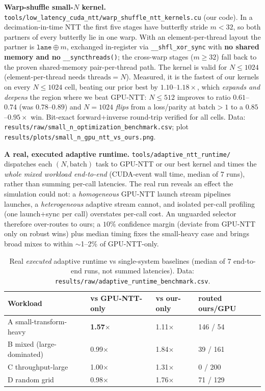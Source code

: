\documentclass[11pt,a4paper]{article}
\begin{document}
\textbf{Warp-shuffle small-$N$ kernel.}
\texttt{tools/low\_latency\_cuda\_ntt/warp\_shuffle\_ntt\_kernels.cu} (our code). In a
decimation-in-time NTT the first five stages have butterfly stride $m<32$, so both partners of
every butterfly lie in one warp. With an element-per-thread layout the partner is $\texttt{lane}
\oplus m$, exchanged in-register via \verb|__shfl_xor_sync| with \textbf{no shared memory and no}
\verb|__syncthreads()|; the cross-warp stages ($m\ge32$) fall back to the proven shared-memory
pair-per-thread path. The kernel is valid for $N\le1024$ (element-per-thread needs
$\text{threads}=N$). Measured, it is the fastest of our kernels on every $N\le1024$ cell, beating
our prior best by $1.10$--$1.18\times$, which \emph{expands and deepens} the region where we beat
GPU-NTT: $N\le512$ improves to ratio $0.61$--$0.74$ (was $0.78$--$0.89$) and $N=1024$ \emph{flips}
from a loss/parity at batch${>}1$ to a $0.85$--$0.95\times$ win. Bit-exact forward+inverse
round-trip verified for all cells. Data: \texttt{results/raw/small\_n\_optimization\_benchmark.csv};
plot \texttt{results/plots/small\_n\_gpu\_ntt\_vs\_ours.png}.

\textbf{A real, executed adaptive runtime.} \texttt{tools/adaptive\_ntt\_runtime/} dispatches each
$(N,\text{batch})$ task to GPU-NTT or our best kernel and times the \emph{whole mixed workload
end-to-end} (CUDA-event wall time, median of 7 runs), rather than summing per-call latencies. The
real run reveals an effect the simulation could not: a \emph{homogeneous} GPU-NTT launch stream
pipelines launches, a \emph{heterogeneous} adaptive stream cannot, and isolated per-call profiling
(one launch+sync per call) overstates per-call cost. An unguarded selector therefore over-routes to
ours; a $10\%$ confidence margin (deviate from GPU-NTT only on robust wins) plus median timing
fixes the small-heavy case and brings broad mixes to within $\sim$1--2\% of GPU-NTT-only.

\begin{table}[h]
\centering
\caption{Real \emph{executed} adaptive runtime vs single-system baselines (median of 7 end-to-end
runs, not summed latencies). Data: \texttt{results/raw/adaptive\_runtime\_benchmark.csv}.}
\begin{tabular}{L{4.0cm}R{2.6cm}R{2.2cm}R{2.4cm}}
\toprule
Workload & vs GPU-NTT-only & vs our-only & routed ours/GPU \\
\midrule
A small-transform-heavy   & \textbf{1.57$\times$} & 1.11$\times$ & 146 / 54 \\
B mixed (large-dominated)  & 0.99$\times$          & 1.84$\times$ & 39 / 161 \\
C throughput-large         & 1.00$\times$          & 1.31$\times$ & 0 / 200 \\
D random grid              & 0.98$\times$          & 1.76$\times$ & 71 / 129 \\
\bottomrule
\end{tabular}
\end{table}
\end{document}
